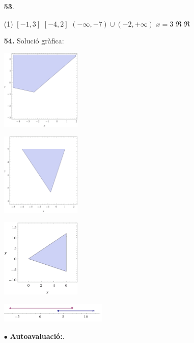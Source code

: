 \documentclass[a4paper, pdf, twoside]{book}
\begin{document}
\begin{multicols}{2}
\begin{enumerate}

 \item[\fontfamily{phv}\selectfont\color{blue}\textbf{53}. ] 
 \begin{tasks}[column-sep=1em, item-indent=1.3333em](1)
	 \task $[-1,3]$
	 \task $[-4,2]$
	 \task* $(-\infty ,-7)\cup (-2,+\infty )$
	 \task $x=3$
	 \task $\Re $
	 \task $\Re $
\end{tasks}
\vspace{0.25cm}
\item[\fontfamily{phv}\selectfont\color{blue}\textbf{54. }] 
Solució gràfica: \par \includegraphics [width=0.3\textwidth ]{img-sol/t2-55a} \par \includegraphics [width=0.3\textwidth ]{img-sol/t2-55b} \par \includegraphics [width=0.3\textwidth ]{img-sol/t2-55c} \par \includegraphics [width=0.4\textwidth ]{img-sol/t2-55d} 
\vspace{0.25cm}
 \item[$\bullet$ ] {\selectfont\color{blue}\textbf{Autoavaluació:}. }


\end{enumerate}
\end{multicols}
\end{document}
